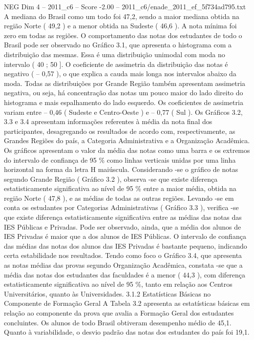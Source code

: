 \begin{textsample}{NEG Dim 4 – 2011\_c6 – Score -2.00 – 2011\_c6/enade\_2011\_ef\_5f734ad795.txt}
A mediana do Brasil como um todo foi 47,2, sendo a maior mediana obtida na região Norte ( 49,2 ) e a menor obtida na Sudeste ( 46,6 ).
A nota mínima foi zero em todas as regiões.
O comportamento das notas dos estudantes de todo o Brasil pode ser observado no Gráfico 3.1, que apresenta o histograma com a distribuição das mesmas.
Essa é uma distribuição unimodal com moda no intervalo ( 40 ; 50 ].
O coeficiente de assimetria da distribuição das notas é negativo ( – 0,57 ), o que explica a cauda mais longa nos intervalos abaixo da moda.
Todas as distribuições por Grande Região também apresentam assimetria negativa, ou seja, há concentração das notas um pouco maior do lado direito do histograma e mais espalhamento do lado esquerdo.
Os coeficientes de assimetria variam entre – 0,46 ( Sudeste e Centro-Oeste ) e – 0,77 ( Sul ).
Os Gráficos 3.2, 3.3 e 3.4 apresentam informações referentes à média da nota final dos participantes, desagregando os resultados de acordo com, respectivamente, as Grandes Regiões do país, a Categoria Administrativa e a Organização Acadêmica.
Os gráficos apresentam o valor da média das notas como uma barra e os extremos do intervalo de confiança de 95 \% como linhas verticais unidas por uma linha horizontal na forma da letra H maiúscula.
Considerando -se o gráfico de notas segundo Grande Região ( Gráfico 3.2 ), observa -se que existe diferença estatisticamente significativa ao nível de 95 \% entre a maior média, obtida na região Norte ( 47,8 ), e as médias de todas as outras regiões.
Levando -se em conta os estudantes por Categorias Administrativas ( Gráfico 3.3 ), verifica -se que existe diferença estatisticamente significativa entre as médias das notas das IES Públicas e Privadas.
Pode ser observado, ainda, que a média dos alunos de IES Privadas é maior que a dos alunos de IES Públicas.
O intervalo de confiança das médias das notas dos alunos das IES Privadas é bastante pequeno, indicando certa estabilidade nos resultados.
Tendo como foco o Gráfico 3.4, que apresenta as notas médias das provas segundo Organização Acadêmica, constata -se que a média das notas dos estudantes das faculdades é a menor ( 44,3 ), com diferença estatisticamente significativa ao nível de 95 \%, tanto em relação aos Centros Universitários, quanto às Universidades. 3.1.2 Estatísticas Básicas no Componente de Formação Geral A Tabela 3.2 apresenta as estatísticas básicas em relação ao componente da prova que avalia a Formação Geral dos estudantes concluintes.
Os alunos de todo Brasil obtiveram desempenho médio de 45,1.
Quanto à variabilidade, o desvio padrão das notas dos estudantes do país foi 19,1.

\end{textsample}
